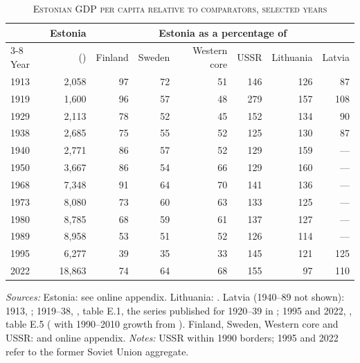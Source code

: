 \begin{table}[htbp]
\centering\small
\caption[Estonian GDP per capita relative to comparators, selected years]{\textsc{Estonian GDP per capita relative to comparators, selected years}}
\label{tab:relative}
\begin{threeparttable}
\begin{tabular}{lrrrrrrr}
\toprule
& Estonia & \multicolumn{6}{c}{Estonia as a percentage of} \\
\cmidrule(lr){3-8}
Year & (\intlnineteen{}) & Finland & Sweden & Western core & USSR & Lithuania & Latvia \\
\midrule
1913 & 2,058 & 97 & 72 & 51 & 146 & 126 & 87 \\
1919 & 1,600 & 96 & 57 & 48 & 279 & 157 & 108 \\
1929 & 2,113 & 78 & 52 & 45 & 152 & 134 & 90 \\
1938 & 2,685 & 75 & 55 & 52 & 125 & 130 & 87 \\
\midrule
1940 & 2,771 & 86 & 57 & 52 & 129 & 159 & --- \\
1950 & 3,667 & 86 & 54 & 66 & 129 & 160 & --- \\
1968 & 7,348 & 91 & 64 & 70 & 141 & 136 & --- \\
1973 & 8,080 & 73 & 60 & 63 & 133 & 125 & --- \\
1980 & 8,785 & 68 & 59 & 61 & 137 & 127 & --- \\
1989 & 8,958 & 53 & 51 & 52 & 126 & 114 & --- \\
\midrule
1995 & 6,277 & 39 & 35 & 33 & 145 & 121 & 125 \\
2022 & 18,863 & 74 & 64 & 68 & 155 & 97 & 110 \\
\bottomrule
\end{tabular}
\begin{tablenotes}
\footnotesize
\textit{Sources:} Estonia: see online appendix. Lithuania: \cite{klimantas2026soviet}. Latvia (1940--89 not shown): 1913, \cite[603]{norkusmark2021}; 1919--38, \cite[316]{klimantas2025thesis}, table E.1, the series published for 1920--39 in \cite{Klimantas2024}; 1995 and 2022, \cite[320]{klimantas2025thesis}, table E.5 (\cite{mpd2023} with 1990--2010 growth from \cite{wdi2024}). Finland, Sweden, Western core and USSR: \cite{mpd2023} and online appendix. \textit{Notes:} USSR within 1990 borders; 1995 and 2022 refer to the former Soviet Union aggregate.
\end{tablenotes}
\end{threeparttable}
\end{table}

